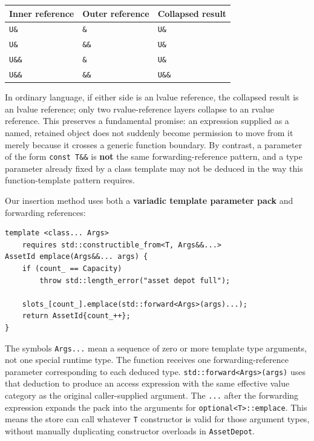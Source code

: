{\def\LTcaptype{none} %
\begin{longtable}[]{@{}lll@{}}
\toprule\noalign{}
Inner reference & Outer reference & Collapsed result \\
\midrule\noalign{}
\endhead
\bottomrule\noalign{}
\endlastfoot
\texttt{U\&} & \texttt{\&} & \texttt{U\&} \\
\texttt{U\&} & \texttt{\&\&} & \texttt{U\&} \\
\texttt{U\&\&} & \texttt{\&} & \texttt{U\&} \\
\texttt{U\&\&} & \texttt{\&\&} & \texttt{U\&\&} \\
\end{longtable}
}

In ordinary language, if either side is an lvalue reference, the collapsed result is an lvalue reference; only two rvalue-reference layers collapse to an rvalue reference. This preserves a fundamental promise: an expression supplied as a named, retained object does not suddenly become permission to move from it merely because it crosses a generic function boundary. By contrast, a parameter of the form \texttt{const\ T\&\&} is \textbf{not} the same forwarding-reference pattern, and a type parameter already fixed by a class template may not be deduced in the way this function-template pattern requires.

Our insertion method uses both a \textbf{variadic template parameter pack} and forwarding references:

\begin{verbatim}
template <class... Args>
    requires std::constructible_from<T, Args&&...>
AssetId emplace(Args&&... args) {
    if (count_ == Capacity)
        throw std::length_error("asset depot full");

    slots_[count_].emplace(std::forward<Args>(args)...);
    return AssetId{count_++};
}
\end{verbatim}

The symbols \texttt{Args...} mean a sequence of zero or more template type arguments, not one special runtime type. The function receives one forwarding-reference parameter corresponding to each deduced type. \texttt{std::forward\textless{}Args\textgreater{}(args)} uses that deduction to produce an access expression with the same effective value category as the original caller-supplied argument. The \texttt{...} after the forwarding expression expands the pack into the arguments for \texttt{optional\textless{}T\textgreater{}::emplace}. This means the store can call whatever \texttt{T} constructor is valid for those argument types, without manually duplicating constructor overloads in \texttt{AssetDepot}.

